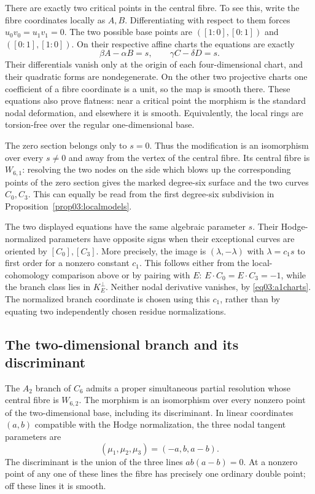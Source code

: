 There are exactly two critical points in the central fibre.  To see
this, write the fibre coordinates locally as $A,B$.  Differentiating
with respect to them forces $u_0v_0=u_1v_1=0$.  The two possible
base points are $([1:0],[0:1])$ and $([0:1],[1:0])$.  On their
respective affine charts the equations are exactly
\begin{equation}\label{eq03:a1charts}
 \beta A-\alpha B=s,
 \qquad \gamma C-\delta D=s.
\end{equation}
Their differentials vanish only at the origin of each four-dimensional
chart, and their quadratic forms are nondegenerate.  On the other
two projective charts one coefficient of a fibre coordinate is a unit,
so the map is smooth there.  These equations also prove flatness:
near a critical point the morphism is the standard nodal deformation,
and elsewhere it is smooth.  Equivalently, the local rings are
torsion-free over the regular one-dimensional base.

The zero section belongs only to $s=0$.  Thus the modification is an
isomorphism over every $s\ne0$ and away from the vertex of the central
fibre.  Its central fibre is $W_{6,1}$: resolving the two nodes on
the side which blows up the corresponding points of the zero section
gives the marked degree-six surface and the two curves $C_0,C_3$.
This can equally be read from the first degree-six subdivision in
Proposition~\ref{prop03:localmodels}.

The two displayed equations have the same algebraic parameter $s$.
Their Hodge-normalized parameters have opposite signs when their
exceptional curves are oriented by $[C_0],[C_3]$.  More precisely,
the image is $(\lambda,-\lambda)$ with $\lambda=c_1s$ to first
order for a nonzero constant $c_1$.  This follows either from the
local-cohomology comparison above or by pairing with $E$:
$E\cdot C_0=E\cdot C_3=-1$, while the branch class lies in
$K_E^\perp$.  Neither nodal derivative vanishes, by
\eqref{eq03:a1charts}.  The normalized branch coordinate is chosen
using this $c_1$, rather than by equating two independently chosen
residue normalizations.

\subsection{The two-dimensional branch and its discriminant}

\begin{proposition}\label{prop03:a2family}
The $A_2$ branch of $C_6$ admits a proper simultaneous partial
resolution whose central fibre is $W_{6,2}$.  The morphism is an
isomorphism over every nonzero point of the two-dimensional base,
including its discriminant.  In linear coordinates $(a,b)$ compatible
with the Hodge normalization, the three nodal tangent parameters are
\[
 (\mu_1,\mu_2,\mu_3)=(-a,b,a-b).
\]
The discriminant is the union of the three lines
$ab(a-b)=0$.  At a nonzero point of any one of these lines the fibre
has precisely one ordinary double point; off these lines it is smooth.
\end{proposition}


